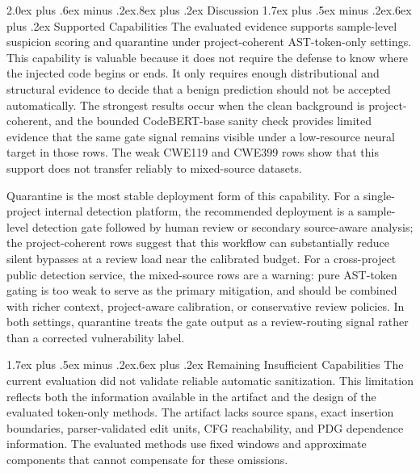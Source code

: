 \documentclass[letterpaper,twocolumn,10pt,twoside]{article}
\makeatletter
\renewcommand\section{\@startsection{section}{1}{\z@}%
  {2.0ex plus .6ex minus .2ex}{.8ex plus .2ex}%
  {\normalfont\large\bfseries}}
\renewcommand\subsection{\@startsection{subsection}{2}{\z@}%
  {1.7ex plus .5ex minus .2ex}{.6ex plus .2ex}%
  {\normalfont\normalsize\bfseries}}
\newcommand{\dataset}[1]{\textsc{#1}}
\makeatother
\begin{document}
\section{Discussion}
\subsection{Supported Capabilities}
The evaluated evidence supports sample-level suspicion scoring and quarantine under project-coherent AST-token-only settings. This capability is valuable because it does not require the defense to know where the injected code begins or ends. It only requires enough distributional and structural evidence to decide that a benign prediction should not be accepted automatically. The strongest results occur when the clean background is project-coherent, and the bounded CodeBERT-base sanity check provides limited evidence that the same gate signal remains visible under a low-resource neural target in those rows. The weak \dataset{CWE119} and \dataset{CWE399} rows show that this support does not transfer reliably to mixed-source datasets.

Quarantine is the most stable deployment form of this capability. For a single-project internal detection platform, the recommended deployment is a sample-level detection gate followed by human review or secondary source-aware analysis; the project-coherent rows suggest that this workflow can substantially reduce silent bypasses at a review load near the calibrated budget. For a cross-project public detection service, the mixed-source rows are a warning: pure AST-token gating is too weak to serve as the primary mitigation, and should be combined with richer context, project-aware calibration, or conservative review policies. In both settings, quarantine treats the gate output as a review-routing signal rather than a corrected vulnerability label.

\subsection{Remaining Insufficient Capabilities}
The current evaluation did not validate reliable automatic sanitization. This limitation reflects both the information available in the artifact and the design of the evaluated token-only methods. The artifact lacks source spans, exact insertion boundaries, parser-validated edit units, CFG reachability, and PDG dependence information. The evaluated methods use fixed windows and approximate components that cannot compensate for these omissions.
\end{document}
